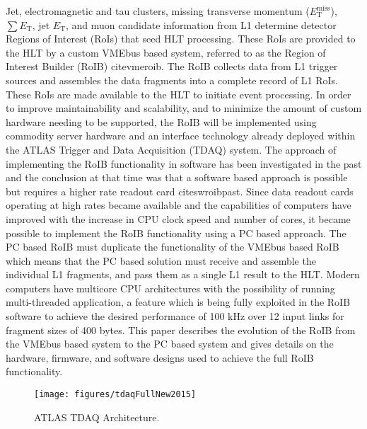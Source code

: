 Jet, electromagnetic and tau clusters, missing transverse momentum ($E_{\mathrm{T}}^{\mathrm{miss}}$), $\sum E_{\mathrm{T}}$, 
jet $E_{\mathrm{T}}$, and muon candidate information from L1 determine detector Regions of Interest (RoIs) that seed HLT processing. These RoIs are provided to the HLT by a custom VMEbus based system, referred to as the Region of Interest Builder (RoIB) cite{vmeroib}.
The RoIB collects data from L1 
trigger sources and assembles the data fragments into a complete record of L1 RoIs. These RoIs are made available to the HLT to initiate event processing. In order to improve maintainability and scalability, and to minimize the amount of custom hardware needing to be supported, 
the RoIB will be implemented using commodity server hardware and an interface technology already deployed 
within the ATLAS Trigger and Data Acquisition (TDAQ) system. The approach of implementing the RoIB functionality in software has been investigated in the past 
and the conclusion at that time was that a software based approach is possible but requires a higher rate readout card cite{swroibpast}. 
Since data readout cards operating at high rates became available and the capabilities of computers have improved with the increase 
in CPU clock speed and number of cores, it became possible to implement the RoIB functionality using a PC based approach. 
The PC based RoIB must duplicate the functionality of the VMEbus based RoIB which means that the PC based solution must receive and assemble the
individual L1 fragments, and pass them as a single L1 result to the HLT. Modern computers have multicore CPU architectures 
with the possibility of running multi-threaded application, a feature which is being fully exploited in the RoIB software to achieve 
the desired performance of 100 kHz over 12 input links for fragment sizes of 400 bytes.  
This paper describes the evolution of the RoIB from the VMEbus based system to the PC based system and gives details on the hardware, 
firmware, and software designs used to achieve the full RoIB functionality. 



\begin{figure}[tbp] %
\centering
\texttt{[image: figures/tdaqFullNew2015]}
\caption{ATLAS TDAQ Architecture.}
\label{fig:atlas_tdaq}
\end{figure}



